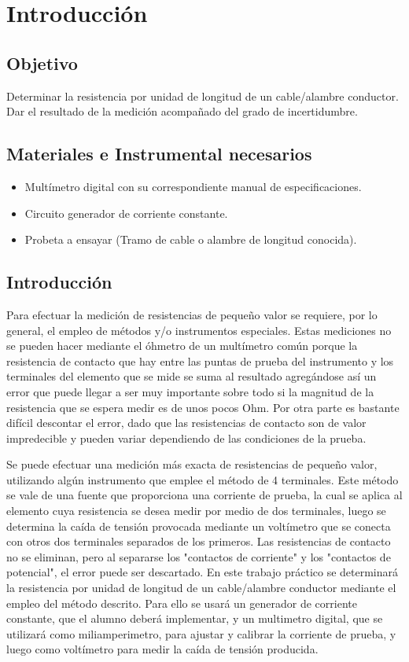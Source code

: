 \chapter{Introducción}
\section{Objetivo}
Determinar la resistencia por unidad de longitud de un cable/alambre conductor. Dar el resultado de la medición acompañado del grado de incertidumbre.

\section{Materiales e Instrumental necesarios}
\begin{itemize}
  \item Multímetro digital con su correspondiente manual de especificaciones.
  \item Circuito generador de corriente constante.
  \item Probeta a ensayar (Tramo de cable o alambre de longitud conocida).
\end{itemize}

\section{Introducción}
Para efectuar la medición de  resistencias de pequeño valor se requiere, por lo general, el empleo de métodos y/o instrumentos especiales.
Estas mediciones no se pueden hacer mediante el óhmetro de un multímetro común porque la resistencia de contacto que hay entre  las puntas de prueba del instrumento  y los terminales del elemento que se mide se suma al resultado agregándose así un error que puede llegar a ser muy importante sobre todo si la magnitud de la resistencia que se espera medir es de unos pocos Ohm.
Por otra parte es bastante difícil descontar  el error, dado que las resistencias de contacto son de valor impredecible y pueden variar dependiendo de las condiciones de la prueba.

Se puede efectuar una medición más exacta de resistencias de pequeño valor, utilizando  algún instrumento que emplee  el método de 4 terminales.
Este método se vale de una fuente que proporciona una corriente de prueba,  la cual se aplica al elemento cuya resistencia se desea medir por medio de  dos terminales, luego se determina la caída de tensión provocada mediante un voltímetro que se conecta con otros dos terminales separados de los primeros.
Las resistencias de contacto no se eliminan, pero al separarse los "contactos  de corriente" y los  "contactos  de potencial",  el error puede ser  descartado.
En este trabajo práctico se determinará la resistencia por unidad de longitud de un cable/alambre conductor mediante el empleo del método descrito.
Para ello se usará  un generador de corriente constante, que el alumno deberá implementar, y un multimetro digital, que se utilizará como  miliamperimetro, para ajustar y calibrar la corriente de prueba, y luego como voltímetro para   medir la caída de tensión producida.

